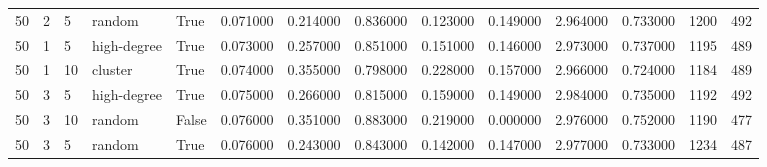 \begin{table}
\begin{tabular}{llllllllllllll}
50 & 2 & 5 & random & True & 0.071000 & 0.214000 & 0.836000 & 0.123000 & 0.149000 & 2.964000 & 0.733000 & 1200 & 492 \\
50 & 1 & 5 & high-degree & True & 0.073000 & 0.257000 & 0.851000 & 0.151000 & 0.146000 & 2.973000 & 0.737000 & 1195 & 489 \\
50 & 1 & 10 & cluster & True & 0.074000 & 0.355000 & 0.798000 & 0.228000 & 0.157000 & 2.966000 & 0.724000 & 1184 & 489 \\
50 & 3 & 5 & high-degree & True & 0.075000 & 0.266000 & 0.815000 & 0.159000 & 0.149000 & 2.984000 & 0.735000 & 1192 & 492 \\
50 & 3 & 10 & random & False & 0.076000 & 0.351000 & 0.883000 & 0.219000 & 0.000000 & 2.976000 & 0.752000 & 1190 & 477 \\
50 & 3 & 5 & random & True & 0.076000 & 0.243000 & 0.843000 & 0.142000 & 0.147000 & 2.977000 & 0.733000 & 1234 & 487 \\
\bottomrule
\end{tabular}
\end{table}
